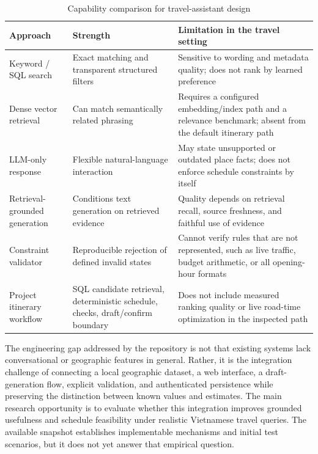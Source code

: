 \begin{table}[htbp]
    \centering
    \caption{Capability comparison for travel-assistant design}
    \label{tab:related_comparison}
    \renewcommand{\arraystretch}{1.25}
    \begin{tabularx}{\textwidth}{>{\raggedright\arraybackslash}p{3.0cm} >{\raggedright\arraybackslash}p{4.0cm} X}
        \toprule
        \textbf{Approach} & \textbf{Strength} & \textbf{Limitation in the travel setting} \\
        \midrule
        Keyword / SQL search & Exact matching and transparent structured filters & Sensitive to wording and metadata quality; does not rank by learned preference \\
Dense vector retrieval & Can match semantically related phrasing \cite{karpukhin2020dense,reimers2019sentence} & Requires a configured embedding/index path and a relevance benchmark; absent from the default itinerary path \\
        LLM-only response & Flexible natural-language interaction \cite{brown2020language} & May state unsupported or outdated place facts; does not enforce schedule constraints by itself \\
        Retrieval-grounded generation & Conditions text generation on retrieved evidence \cite{lewis2020retrieval} & Quality depends on retrieval recall, source freshness, and faithful use of evidence \\
        Constraint validator & Reproducible rejection of defined invalid states & Cannot verify rules that are not represented, such as live traffic, budget arithmetic, or all opening-hour formats \\
        Project itinerary workflow & SQL candidate retrieval, deterministic schedule, checks, draft/confirm boundary & Does not include measured ranking quality or live road-time optimization in the inspected path \\
        \bottomrule
    \end{tabularx}
\end{table}

The engineering gap addressed by the repository is not that existing systems lack conversational or geographic features in general. Rather, it is the integration challenge of connecting a local geographic dataset, a web interface, a draft-generation flow, explicit validation, and authenticated persistence while preserving the distinction between known values and estimates. The main research opportunity is to evaluate whether this integration improves grounded usefulness and schedule feasibility under realistic Vietnamese travel queries. The available snapshot establishes implementable mechanisms and initial test scenarios, but it does not yet answer that empirical question.
